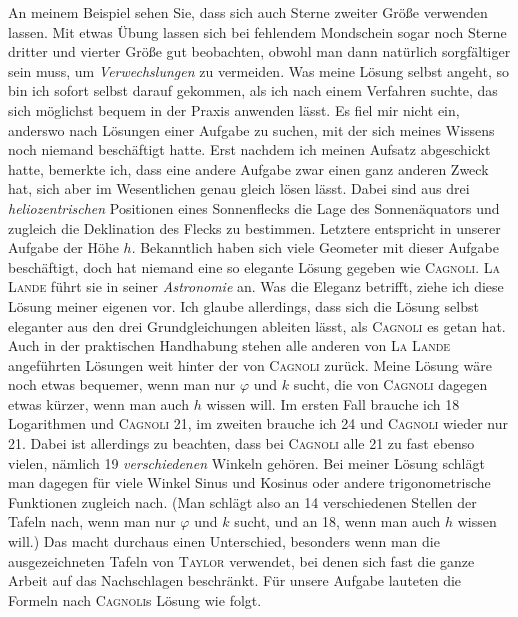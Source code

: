 An meinem Beispiel sehen Sie, dass sich auch Sterne zweiter Größe verwenden lassen. Mit etwas Übung lassen sich bei fehlendem Mondschein sogar noch Sterne dritter und vierter Größe gut beobachten, obwohl man dann natürlich sorgfältiger sein muss, um \emph{Verwechslungen} zu vermeiden. Was meine Lösung selbst angeht, so bin ich sofort selbst darauf gekommen, als ich nach einem Verfahren suchte, das sich möglichst bequem in der Praxis anwenden lässt. Es fiel mir nicht ein, anderswo nach Lösungen einer Aufgabe zu suchen, mit der sich meines Wissens noch niemand beschäftigt hatte. Erst nachdem ich meinen Aufsatz abgeschickt hatte, bemerkte ich, dass eine andere Aufgabe zwar einen ganz anderen Zweck hat, sich aber im Wesentlichen genau gleich lösen lässt. Dabei sind aus drei \emph{heliozentrischen} Positionen eines Sonnenflecks die Lage des Sonnenäquators und zugleich die Deklination des Flecks zu bestimmen. Letztere entspricht in unserer Aufgabe der Höhe $h$. Bekanntlich haben sich viele Geometer mit dieser Aufgabe beschäftigt, doch hat niemand eine so elegante Lösung gegeben wie \textsc{Cagnoli}. \textsc{La Lande} führt sie in seiner \textit{Astronomie} an. Was die Eleganz betrifft, ziehe ich diese Lösung meiner eigenen vor. Ich glaube allerdings, dass sich die Lösung selbst eleganter aus den drei Grundgleichungen ableiten lässt, als \textsc{Cagnoli} es getan hat. Auch in der praktischen Handhabung stehen alle anderen von \textsc{La Lande} angeführten Lösungen weit hinter der von \textsc{Cagnoli} zurück. Meine Lösung wäre noch etwas bequemer, wenn man nur $\varphi$ und $k$ sucht, die von \textsc{Cagnoli} dagegen etwas kürzer, wenn man auch $h$ wissen will. Im ersten Fall brauche ich 18 Logarithmen und \textsc{Cagnoli} 21, im zweiten brauche ich 24 und \textsc{Cagnoli} wieder nur 21. Dabei ist allerdings zu beachten, dass bei \textsc{Cagnoli} alle 21 zu fast ebenso vielen, nämlich 19 \emph{verschiedenen} Winkeln gehören. Bei meiner Lösung schlägt man dagegen für viele Winkel Sinus und Kosinus oder andere trigonometrische Funktionen zugleich nach. (Man schlägt also an 14 verschiedenen Stellen der Tafeln nach, wenn man nur $\varphi$ und $k$ sucht, und an 18, wenn man auch $h$ wissen will.) Das macht durchaus einen Unterschied, besonders wenn man die ausgezeichneten Tafeln von \textsc{Taylor} verwendet, bei denen sich fast die ganze Arbeit auf das Nachschlagen beschränkt. Für unsere Aufgabe lauteten die Formeln nach \textsc{Cagnoli}s Lösung wie folgt.

